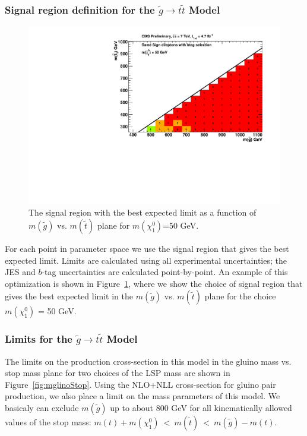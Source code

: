 \subsubsection{Signal region definition for the $\widetilde{g} \to t\widetilde{t}$ Model}
\label{sec:firststopdefinition}

\begin{figure}[htb]
\begin{center}
\includegraphics[width=0.50\linewidth]{figs/GlStop_50_BestSignalRegion.pdf}
\caption{The signal region with the best expected limit as a function of 
$m(\widetilde{g})$ vs. $m(\widetilde{t})$ plane for $m(\chi^0_1)$=50 GeV.
\label{fig:gluinostoptimize}}
\end{center}
\end{figure}


For each point in parameter space we use the signal region that gives
the best expected limit.  
Limits are calculated using all experimental
uncertainties; the JES and $b$-tag uncertainties are calculated point-by-point.
An example of this optimization is shown in Figure~\ref{fig:gluinostoptimize},
where we show the choice of signal region that gives the best expected limit
in the $m(\widetilde{g})$ vs. $m(\widetilde{t})$ plane for the choice
$m(\chi^0_1)$ = 50 GeV.




\subsubsection{Limits for the $\widetilde{g} \to t\widetilde{t}$ Model}
\label{sec:firststoplimits}

The limits on the production cross-section in this model in the 
gluino mass vs. stop mass plane for two choices of the 
LSP mass are shown in Figure~\ref{fig:mglinoStop}.
Using the 
NLO$+$NLL cross-section for gluino pair production, we also place a limit
on the mass parameters of this model.  We basicaly can exclude 
$m(\widetilde{g})$ up to about 800 GeV for all kinematically allowed
values of the stop mass: 
$m(t)+m(\chi^0_1)~<~m(\widetilde{t})~<~m(\widetilde{g})-m(t)$. 



